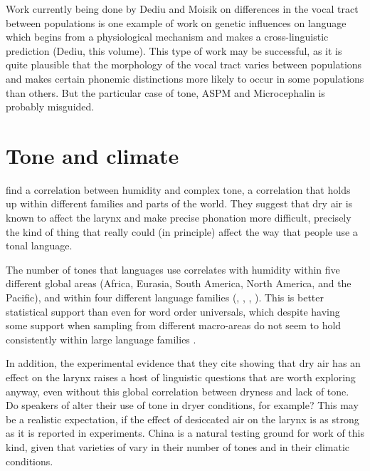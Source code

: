 \documentclass[output=paper]{langsci/langscibook}
\begin{document}
Work currently being done by Dediu and Moisik on differences in the vocal tract between populations is one example of work on genetic influences on language which begins from a physiological mechanism and makes a cross-linguistic prediction (Dediu, this volume).  This type of work may be successful, as it is quite plausible that the morphology of the vocal tract varies between populations and makes certain phonemic distinctions more likely to occur in some populations than others.  But the particular case of tone, ASPM and Microcephalin is probably misguided.



\section{Tone and climate}

  \citet{Everett2015} find a correlation between humidity and complex tone, a correlation that holds up within different families and parts of the world.  They suggest that dry air is known to affect the larynx and make precise phonation more difficult, precisely the kind of thing that really could (in principle) affect the way that people use a tonal language.



The number of tones that languages use correlates with humidity within five different global areas (Africa, Eurasia, South America, North America, and the Pacific), and within four different language families (, , , ).  This is better statistical support than even for word order universals, which despite having some support when sampling from different macro-areas \citep{Dryer1992greenbergian} do not seem to hold consistently within large language families \citep{Dunn2011}.     



In addition, the experimental evidence that they cite showing that dry air has an effect on the larynx raises a host of linguistic questions that are worth exploring anyway, even without this global correlation between dryness and lack of tone.  Do speakers of  alter their use of tone in dryer conditions, for example?  This may be a realistic expectation, if the effect of desiccated air on the larynx is as strong as it is reported in experiments.  China is a natural testing ground for work of this kind, given that varieties of  vary in their number of tones and in their climatic conditions.  
\end{document}
